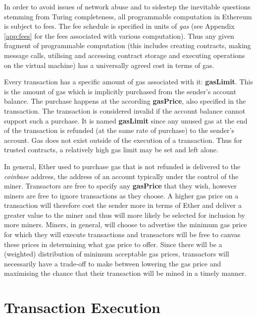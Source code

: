 \documentclass[9pt,oneside]{amsart}
\begin{document}
\begin{multicols}{2}
In order to avoid issues of network abuse and to sidestep the inevitable questions stemming from Turing completeness, all programmable computation in Ethereum is subject to fees. The fee schedule is specified in units of \textit{gas} (see Appendix \ref{app:fees} for the fees associated with various computation). Thus any given fragment of programmable computation (this includes creating contracts, making message calls, utilising and accessing contract storage and executing operations on the virtual machine) has a universally agreed cost in terms of gas.

Every transaction has a specific amount of gas associated with it: \textbf{gasLimit}. This is the amount of gas which is implicitly purchased from the sender's account balance. The purchase happens at the according \textbf{gasPrice}, also specified in the transaction. The transaction is considered invalid if the account balance cannot support such a purchase. It is named \textbf{gasLimit} since any unused gas at the end of the transaction is refunded (at the same rate of purchase) to the sender's account. Gas does not exist outside of the execution of a transaction. Thus for trusted contracts, a relatively high gas limit may be set and left alone.

In general, Ether used to purchase gas that is not refunded is delivered to the \textit{coinbase} address, the address of an account typically under the control of the miner. Transactors are free to specify any \textbf{gasPrice} that they wish, however miners are free to ignore transactions as they choose. A higher gas price on a transaction will therefore cost the sender more in terms of Ether and deliver a greater value to the miner and thus will more likely be selected for inclusion by more miners. Miners, in general, will choose to advertise the minimum gas price for which they will execute transactions and transactors will be free to canvas these prices in determining what gas price to offer. Since there will be a (weighted) distribution of minimum acceptable gas prices, transactors will necessarily have a trade-off to make between lowering the gas price and maximising the chance that their transaction will be mined in a timely manner.


\section{Transaction Execution} \label{ch:transactions}


\end{multicols}
\end{document}
